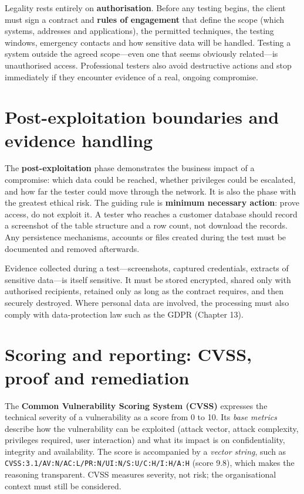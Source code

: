 Legality rests entirely on \textbf{authorisation}. Before any testing begins, the client must sign a contract and \textbf{rules of engagement} that define the scope (which systems, addresses and applications), the permitted techniques, the testing windows, emergency contacts and how sensitive data will be handled. Testing a system outside the agreed scope—even one that seems obviously related—is unauthorised access. Professional testers also avoid destructive actions and stop immediately if they encounter evidence of a real, ongoing compromise.

\section{Post-exploitation boundaries and evidence handling}\label{sec:10.5}
The \textbf{post-exploitation} phase demonstrates the business impact of a compromise: which data could be reached, whether privileges could be escalated, and how far the tester could move through the network. It is also the phase with the greatest ethical risk. The guiding rule is \textbf{minimum necessary action}: prove access, do not exploit it. A tester who reaches a customer database should record a screenshot of the table structure and a row count, not download the records. Any persistence mechanisms, accounts or files created during the test must be documented and removed afterwards.

Evidence collected during a test—screenshots, captured credentials, extracts of sensitive data—is itself sensitive. It must be stored encrypted, shared only with authorised recipients, retained only as long as the contract requires, and then securely destroyed. Where personal data are involved, the processing must also comply with data-protection law such as the GDPR (Chapter 13).

\section{Scoring and reporting: CVSS, proof and remediation}\label{sec:10.6}
The \textbf{Common Vulnerability Scoring System (CVSS)} expresses the technical severity of a vulnerability as a score from 0 to 10. Its \emph{base metrics} describe how the vulnerability can be exploited (attack vector, attack complexity, privileges required, user interaction) and what its impact is on confidentiality, integrity and availability. The score is accompanied by a \emph{vector string}, such as \texttt{CVSS:3.1/AV:N/AC:L/PR:N/UI:N/S:U/C:H/I:H/A:H} (score 9.8), which makes the reasoning transparent. CVSS measures severity, not risk; the organisational context must still be considered.

